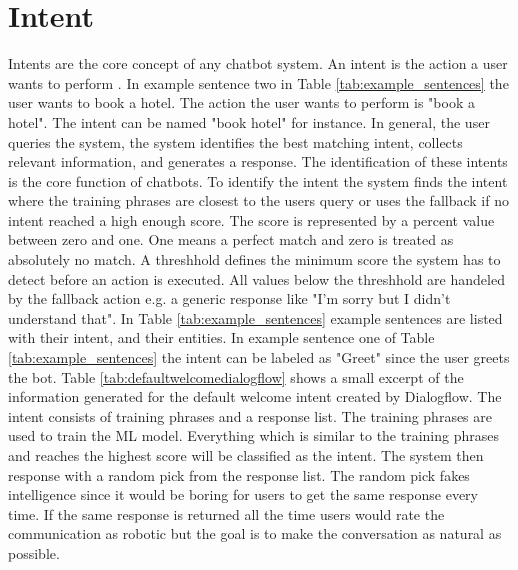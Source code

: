 \section{Intent} \label{sec:intent}
Intents are the core concept of any chatbot system.
An intent is the action a user wants to perform \cite{dutta2017developing, rahman2017programming}.
In example sentence two in Table \ref{tab:example_sentences} the user wants to book a hotel.
The action the user wants to perform is "book a hotel".
The intent can be named "book hotel" for instance.
In general, the user queries the system, the system identifies the best matching intent, 
collects relevant information, and generates a response.
The identification of these intents is the core function of chatbots.
To identify the intent the system finds the intent where the training phrases are closest to 
the users query or uses the fallback if no intent reached a high enough score.
The score is represented by a percent value between zero and one.
One means a perfect match and zero is treated as absolutely no match.
A threshhold defines the minimum score the system has to detect before an action is executed.
All values below the threshhold are handeled by the fallback action e.g. a generic response like 
"I'm sorry but I didn't understand that".
In Table \ref{tab:example_sentences} example sentences are listed with their intent, and their entities.
In example sentence one of Table \ref{tab:example_sentences} the intent can be labeled as 
"Greet" since the user greets the bot.
Table \ref{tab:defaultwelcomedialogflow} shows a small excerpt of the information generated for
the default welcome intent created by Dialogflow.
The intent consists of training phrases and a response list.
The training phrases are used to train the ML model.
Everything which is similar to the training phrases and reaches the highest score 
will be classified as the intent.
The system then response with a random pick from the response list.
The random pick fakes intelligence since it would be boring for 
users to get the same response every time.
If the same response is returned all the time users would rate the communication as robotic 
but the goal is to make the conversation as natural as possible.

